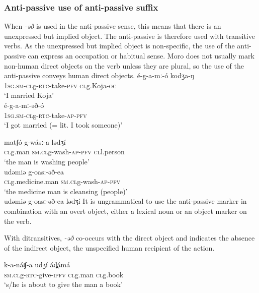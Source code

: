 \subsubsection{Anti-passive use of anti-passive suffix}
When \textit{-əð} is used in the anti-passive sense, this means that there is an unexpressed but implied object. The anti-passive is therefore used with transitive verbs. As the unexpressed but implied object is non-specific, the use of the anti-passive can express an occupation or habitual sense. Moro does not usually mark non-human direct objects on the verb unless they are plural, so the use of the anti-passive conveys human direct objects.
\ea
\ea \gll 	é-g-a-mː-ó 			kodʒa-ŋ  \\
	1\textsc{sg.sm-cl}g-\textsc{rtc}-take-\textsc{pfv}	\textsc{cl}g.Koja-\textsc{oc}\\
	\trans ‘I married Koja’\\

\ex \gll	é-g-a-mː-əð-ó  \\
	1\textsc{sg.sm-cl}g-\textsc{rtc}-take-\textsc{ap-\textsc{pfv}}	 \\
	\trans ‘I got married (= lit.  I took someone)’\\
\z
\z

\ea
\ea \gll	matʃó 		g-wásː-a 		lədʒí	\\
	\textsc{cl}g.man	\textsc{sm.cl}g-wash-\textsc{ap-\textsc{pfv}}	\textsc{cl}l.person	\\
	\trans ‘the man is washing people’\\

\ex \gll	udəmiə 			g-oasː-əð-ea\\
		\textsc{cl}g.medicine.man	\textsc{sm.cl}g-wash-\textsc{ap-\textsc{pfv}}		\\
	\trans ‘the medicine man is cleansing (people)’\\

\ex	* udəmiə g-oasː-əð-ea lədʒí
\z
\z
It is ungrammatical to use the anti-passive marker in combination with an overt object, either a lexical noun or an object marker on the verb. 

With ditransitives, \textit{-əð} co-occurs with the direct object and indicates the absence of the indirect object, the unspecified human recipient of the action.

\ea
\ea \gll	k-a-náʧ-a 			udʒí 		ád̪ámá  \\
	\textsc{sm.cl}g-\textsc{rtc}-give-\textsc{ipfv}	\textsc{cl}g.man	\textsc{cl}g.book  \\
	\trans ‘s/he is about to give the man a book’\\

